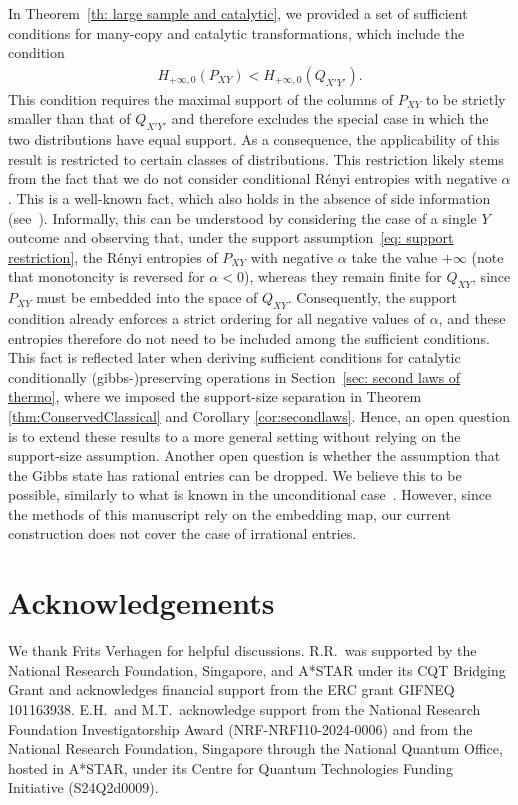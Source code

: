 \documentclass[aps,pra,11pt,onecolumn,nofootinbib,tightenlines]{revtex4-2}
\theoremstyle{definition}
\begin{document}
In Theorem~\ref{th: large sample and catalytic}, we provided a set of sufficient conditions for many-copy and catalytic transformations, which include the condition
\begin{align}
\label{eq: support restriction}
    H_{+\infty,0}(P_{XY}) < H_{+\infty,0}(Q_{X'Y'}) .
\end{align}
This condition requires the maximal support of the columns of $P_{XY}$ to be strictly smaller than that of $Q_{X'Y'}$ and therefore excludes the special case in which the two distributions have equal support.
As a consequence, the applicability of this result is restricted to certain classes of distributions.
 This restriction likely stems from the fact that we do not consider conditional R\'enyi entropies with negative $\alpha$. This is a well-known fact, which also holds in the absence of side information (see~\cite{Jensen_Kjaerulf_2019,farooq2024matrix}).
 Informally, this can be understood by considering the case of a single $Y$ outcome and observing that, under the support assumption~\eqref{eq: support restriction}, the R\'enyi entropies of $P_{XY}$ with negative $\alpha$ take the value $+\infty$ (note that monotoncity is reversed for $\alpha<0$), whereas they remain finite for $Q_{XY}$, since $P_{XY}$ must be embedded into the space of $Q_{XY}$. 
Consequently, the support condition already enforces a strict ordering for all negative values of $\alpha$, and these entropies therefore do not need to be included among the sufficient conditions.
This fact is reflected later when deriving sufficient conditions for catalytic conditionally (gibbs-)preserving operations in Section~\ref{sec: second laws of thermo}, where we imposed the support-size separation in Theorem \ref{thm:ConservedClassical} and Corollary \ref{cor:secondlaws}.
Hence, an open question is to extend these results to a more general setting without relying on the support-size assumption.
Another open question is whether the assumption that the Gibbs state has rational entries can be dropped. We believe this to be possible, similarly to what is known in the unconditional case~\cite{farooq2024matrix}. However, since the methods of this manuscript rely on the embedding map, our current construction does not cover the case of irrational entries.


\section{Acknowledgements}
We thank Frits Verhagen for helpful discussions. R.R.\ was supported by the National Research Foundation, Singapore, and A*STAR under its CQT Bridging Grant and acknowledges financial support from the ERC grant GIFNEQ 101163938. E.H.\ and M.T.\ acknowledge support from the National Research Foundation Investigatorship Award (NRF-NRFI10-2024-0006) and from the National Research Foundation, Singapore through the National Quantum Office, hosted in A*STAR, under its Centre for Quantum Technologies Funding Initiative (S24Q2d0009).
\end{document}
